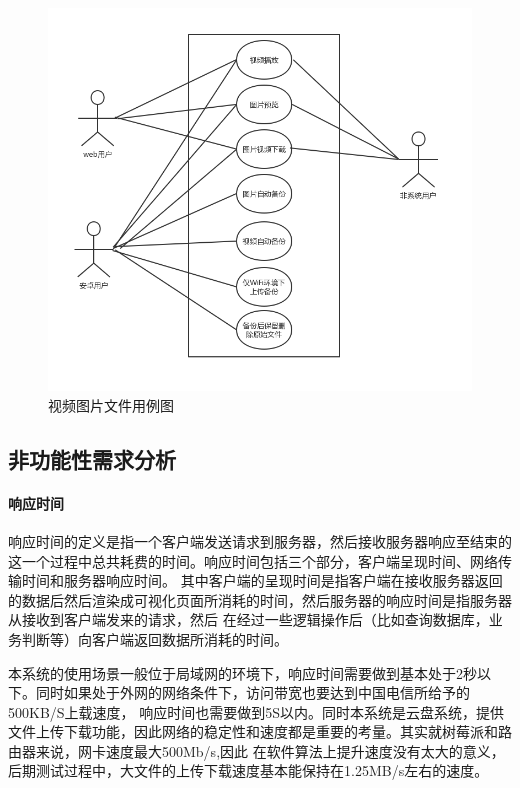 \begin{figure}[H]
  \centering
  \includegraphics[width=130mm]{./figures/img_video_yongli.png}
  \caption{视频图片文件用例图}
\end{figure}

\subsection{非功能性需求分析}
\paragraph{响应时间} 
响应时间的定义是指一个客户端发送请求到服务器，然后接收服务器响应至结束的这一个过程中总共耗费的时间。响应时间包括三个部分，客户端呈现时间、网络传输时间和服务器响应时间。
其中客户端的呈现时间是指客户端在接收服务器返回的数据后然后渲染成可视化页面所消耗的时间，然后服务器的响应时间是指服务器从接收到客户端发来的请求，然后
在经过一些逻辑操作后（比如查询数据库，业务判断等）向客户端返回数据所消耗的时间。

本系统的使用场景一般位于局域网的环境下，响应时间需要做到基本处于2秒以下。同时如果处于外网的网络条件下，访问带宽也要达到中国电信所给予的500KB/S上载速度，
响应时间也需要做到5S以内。同时本系统是云盘系统，提供文件上传下载功能，因此网络的稳定性和速度都是重要的考量。其实就树莓派和路由器来说，网卡速度最大500Mb/s,因此
在软件算法上提升速度没有太大的意义，后期测试过程中，大文件的上传下载速度基本能保持在1.25MB/s左右的速度。

